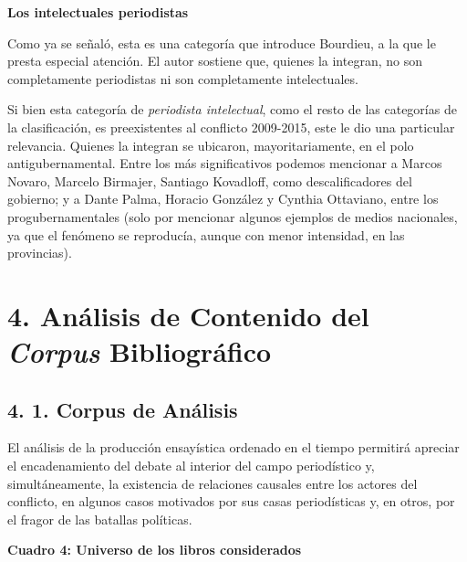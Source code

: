 {\textbf{Los intelectuales periodistas}

Como ya se señaló, esta es una categoría que introduce Bourdieu, a la que le presta especial atención. El autor sostiene que, quienes la integran, no son completamente periodistas ni son completamente intelectuales.

Si bien esta categoría de \emph{periodista intelectual}, como el resto de las categorías de la clasificación, es preexistentes al conflicto 2009-2015, este le dio una particular relevancia. Quienes la integran se ubicaron, mayoritariamente, en el polo antigubernamental. Entre los más significativos podemos mencionar a Marcos Novaro, Marcelo Birmajer, Santiago Kovadloff, como descalificadores del gobierno; y a Dante Palma, Horacio González y Cynthia Ottaviano, entre los progubernamentales (solo por mencionar algunos ejemplos de medios nacionales, ya que el fenómeno se reproducía, aunque con menor intensidad, en las provincias).

\chapter{4. Análisis de Contenido del \emph{Corpus} Bibliográfico}

\section{4. 1. Corpus de Análisis}

El análisis de la producción ensayística ordenado en el tiempo permitirá apreciar el encadenamiento del debate al interior del campo periodístico y, simultáneamente, la existencia de relaciones causales entre los actores del conflicto, en algunos casos motivados por sus casas periodísticas y, en otros, por el fragor de las batallas políticas.

\textbf{Cuadro 4: Universo de los libros considerados}

}
